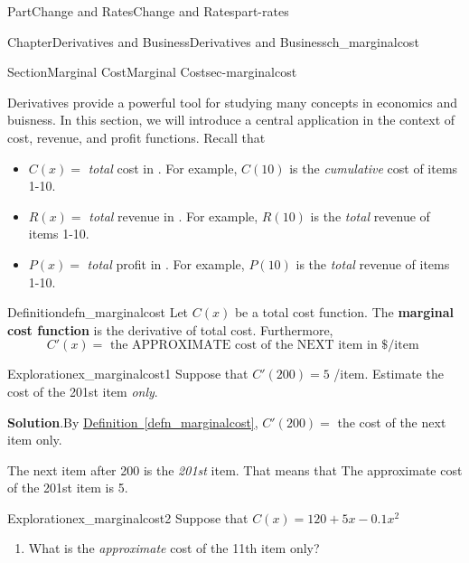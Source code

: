 \documentclass[oneside,10pt,]{tufte-book}
\newcommand{\blocktitlefont}{\relax}
\newcommand{\xreffont}{\relax}
\newcommand{\terminology}[1]{\textbf{#1}}
\numberwithin{equation}{chapter}
\begin{document}
\begin{partptx}{Part}{Change and Rates}{}{Change and Rates}{}{}{part-rates}
\begin{chapterptx}{Chapter}{Derivatives and Business}{}{Derivatives and Business}{}{}{ch_marginalcost}
\typeout{************************************************}
%
\begin{sectionptx}{Section}{Marginal Cost}{}{Marginal Cost}{}{}{sec-marginalcost}
\begin{introduction}{}%
Derivatives provide a powerful tool for studying many concepts in economics and buisness.  In this section, we will introduce a central application in the context of cost, revenue, and profit functions. Recall that%
\begin{itemize}[label=\textbullet]
\item{}\(C(x) = \) \emph{total} cost in \textdollar{}.  For example, \(C(10)\) is the \emph{cumulative} cost of items 1-10.%
\item{}\(R(x) = \) \emph{total} revenue in \textdollar{}.  For example, \(R(10)\) is the \emph{total} revenue of items 1-10.%
\item{}\(P(x) = \) \emph{total} profit in \textdollar{}.  For example, \(P(10)\) is the \emph{total} revenue of items 1-10.%
\end{itemize}
%
\end{introduction}%
\begin{definition}{Definition}{}{defn_marginalcost}%
Let \(C(x)\) be a total cost function. The \terminology{marginal cost function} is the derivative of total cost. Furthermore,%
\begin{equation*}
C'(x) = \text{ the APPROXIMATE cost of the NEXT item in \$/item }
\end{equation*}
%
\end{definition}
\begin{exploration}{Exploration}{}{ex_marginalcost1}%
Suppose that \(C'(200) = 5\) \textdollar{}\slash{}item. Estimate the cost of the 201st item \emph{only}.%
\par\smallskip%
\noindent\textbf{\blocktitlefont Solution}.\hypertarget{ex_marginalcost1-2}{}\quad{}By \hyperref[defn_marginalcost]{Definition~{\xreffont\ref{defn_marginalcost}}}, \(C'(200) = \) the cost of the next item only.%
\par
The next item after 200 is the \emph{201st} item.  That means that The approximate cost of the 201st item is 5\textdollar{}.%
\end{exploration}%
\begin{exploration}{Exploration}{}{ex_marginalcost2}%
Suppose that \(C(x) = 120 + 5x - 0.1 x^2\)%
\begin{enumerate}[font=\bfseries,label=(\alph*),ref=\alph*]%
\item{}What is the \emph{approximate} cost of the 11th item only?%

\end{enumerate}
\end{exploration}
\end{sectionptx}
\end{chapterptx}
\end{partptx}
\end{document}
